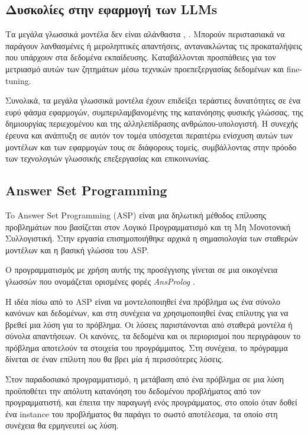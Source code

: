 \documentclass[12pt]{extarticle}
\begin{document}
\subsection{Δυσκολίες στην εφαρμογή των LLMs}

Τα μεγάλα γλωσσικά μοντέλα δεν είναι αλάνθαστα \cite{Raj2023}, \cite{Ruis2023}. Μπορούν περιστασιακά να παράγουν λανθασμένες ή μεροληπτικές απαντήσεις, αντανακλώντας τις προκαταλήψεις που υπάρχουν στα δεδομένα εκπαίδευσης. Καταβάλλονται προσπάθειες για τον μετριασμό αυτών των ζητημάτων μέσω τεχνικών προεπεξεργασίας δεδομένων και fine-tuning.

Συνολικά, τα μεγάλα γλωσσικά μοντέλα έχουν επιδείξει τεράστιες δυνατότητες σε ένα ευρύ φάσμα εφαρμογών, συμπεριλαμβανομένης της κατανόησης φυσικής γλώσσας, της δημιουργίας περιεχομένου και της αλληλεπίδρασης ανθρώπου-υπολογιστή. Η συνεχής έρευνα και ανάπτυξη σε αυτόν τον τομέα υπόσχεται περαιτέρω ενίσχυση αυτών των μοντέλων και των εφαρμογών τους σε διάφορους τομείς, συμβάλλοντας στην πρόοδο των τεχνολογιών γλωσσικής επεξεργασίας και επικοινωνίας.

\subsection{Answer Set Programming}
To Answer Set Programming (ASP) \cite{Eiter2009} είναι μια δηλωτική μέθοδος επίλυσης προβλημάτων που βασίζεται στον Λογικό Προγραμματισμό και τη Μη Μονοτονική Συλλογιστική.  
Στην εργασία \cite{Gelfond2000} επισημοποιήθηκε αρχικά η σημασιολογία των σταθερών μοντέλων και η βασική γλώσσα του ASP.

Ο προγραμματισμός με χρήση αυτής της προσέγγισης γίνεται σε μια οικογένεια γλωσσών που ονομάζεται ορισμένες φορές \textit{AnsProlog} \cite{Gelfond2002}.

Η ιδέα πίσω από το ASP είναι να μοντελοποιηθεί ένα πρόβλημα ως ένα σύνολο κανόνων και δεδομένων, και στη συνέχεια να χρησιμοποιηθεί ένας επίλυτης για να βρεθεί μια λύση για το πρόβλημα. Οι λύσεις παριστάνονται από σταθερά μοντέλα ή σύνολα απαντήσεων. Οι κανόνες, τα δεδομένα και οι περιορισμοί που περιγράφουν το πρόβλημα αποτελούν τα στοιχεία του προγράμματος. Στη συνέχεια, το πρόγραμμα δίνεται σε έναν επίλυτη που θα βρει μία ή περισσότερες λύσεις. 

Στον παραδοσιακό προγραμματισμό, η μετάβαση από ένα πρόβλημα σε μια λύση προϋποθέτει την απόλυτη κατανόηση του δεδομένου προβλήματος από τον προγραμματιστή, και έπειτα την παραγωγή ενός προγράμματος, στο οποίο όταν δοθεί ένα instance του προβλήματος θα παράγει το σωστό αποτέλεσμα, τα οποίο στη συνέχεια θα ερμηνευτεί ως λύση.
\end{document}
